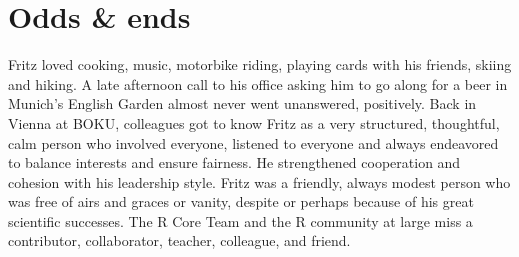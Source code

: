 \section{Odds \& ends}\label{odds-ends}

Fritz loved cooking, music, motorbike riding, playing cards with his
friends, skiing and hiking. A late afternoon call to his office
asking him to go along for a beer in Munich's English Garden almost never went
unanswered, positively. Back in Vienna at BOKU, colleagues got to know Fritz as a very
structured, thoughtful, calm person who involved everyone, listened to
everyone and always endeavored to balance interests and ensure fairness.
He strengthened cooperation and cohesion with his leadership style.
Fritz was a friendly, always modest person who was free of airs and graces or
vanity, despite or perhaps because of his great scientific successes.
The R Core Team and the R community at large miss a contributor,
collaborator, teacher, colleague, and friend.



\address{%
Bettina Grün\\
WU Wirtschaftsuniversität Wien\\%
Austria\\
%
%
\textit{ORCiD: \href{https://orcid.org/0000-0001-7265-4773}{0000-0001-7265-4773}}\\%
\href{mailto:Bettina.Gruen@wu.ac.at}{\nolinkurl{Bettina.Gruen@wu.ac.at}}%
}

\address{%
Kurt Hornik\\
WU Wirtschaftsuniversität Wien\\%
Austria\\
%
%
\textit{ORCiD: \href{https://orcid.org/0000-0003-4198-9911}{0000-0003-4198-9911}}\\%
\href{mailto:Kurt.Hornik@R-project.org}{\nolinkurl{Kurt.Hornik@R-project.org}}%
}

\address{%
Torsten Hothorn\\
Universität Zürich\\%
Switzerland\\
%
%
\textit{ORCiD: \href{https://orcid.org/0000-0001-8301-0471}{0000-0001-8301-0471}}\\%
\href{mailto:Torsten.Hothorn@R-project.org}{\nolinkurl{Torsten.Hothorn@R-project.org}}%
}

\address{%
Theresa Scharl\\
BOKU University\\%
Austria\\
%
%
\textit{ORCiD: \href{https://orcid.org/0000-0001-8850-3312}{0000-0001-8850-3312}}\\%
\href{mailto:Theresa.Scharl@boku.ac.at}{\nolinkurl{Theresa.Scharl@boku.ac.at}}%
}

\address{%
Achim Zeileis\\
Universität Innsbruck\\%
Austria\\
%
\url{https://www.zeileis.org/}\\%
\textit{ORCiD: \href{https://orcid.org/0000-0003-0918-3766}{0000-0003-0918-3766}}\\%
\href{mailto:Achim.Zeileis@R-project.org}{\nolinkurl{Achim.Zeileis@R-project.org}}%
}
